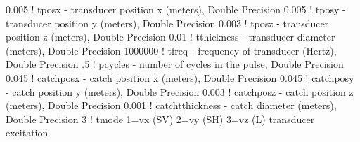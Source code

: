 0.005	  ! tposx - transducer position x (meters), Double Precision
0.005	  ! tposy - transducer position y (meters), Double Precision
0.003 	  ! tposz - transducer position z (meters), Double Precision
0.01	   ! tthickness - transducer diameter  (meters), Double Precision
1000000	 ! tfreq - frequency of transducer (Hertz), Double Precision
.5     	 ! pcycles - number of cycles in the pulse, Double Precision          
0.045	  ! catchposx - catch position x (meters), Double Precision
0.045  	  ! catchposy - catch position y (meters), Double Precision
0.003 	  ! catchposz - catch position z (meters), Double Precision
0.001	  ! catchtthickness - catch diameter  (meters), Double Precision
3	  ! tmode 1=vx (SV) 2=vy (SH) 3=vz (L) transducer excitation
